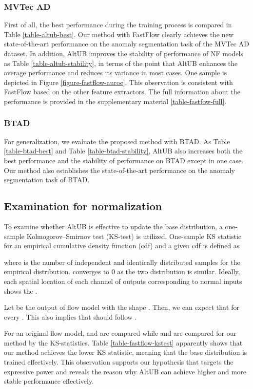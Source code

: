 \documentclass[letterpaper]{article}
\begin{document}
\subsubsection{MVTec AD}
First of all, the best performance during the training process is compared in Table \ref{table-altub-best}. Our method with FastFlow clearly achieves the new state-of-the-art performance on the anomaly segmentation task of the MVTec AD dataset. In addition, AltUB improves the stability of performance of NF models as Table \ref{table-altub-stability}, in terms of the point that AltUB enhances the average performance and reduces its variance in most cases. One sample is depicted in Figure \ref{figure-fastflow-auroc}.
This observation is consistent with FastFlow based on the other feature extractors. The full information about the performance is provided in the supplementary material \ref{table-fastfow-full}.
\subsubsection{BTAD}
For generalization, we evaluate the proposed method with BTAD. As Table \ref{table-btad-best} and Table \ref{table-btad-stability}, AltUB also increases both the best performance and the stability of performance on BTAD except in one case. Our method also establishes the state-of-the-art performance on the anomaly segmentation task of BTAD.

\subsection{Examination for normalization}
To examine whether AltUB is effective to update the base distribution, a one-sample Kolmogorov–Smirnov test (KS-test) is utilized. One-sample KS statistic for an empirical cumulative density function (cdf)  and a given cdf  is defined as 

where  is the number of independent and identically distributed samples for the empirical distribution.
 converges to 0 as the two distribution is similar. Ideally, each spatial location of each channel of outputs corresponding to normal inputs shows the .

Let  be the output of flow model with the shape . Then, we can expect that  for every . This also implies that  should follow .

For an original flow model,  and  are compared while  and  are compared for our method by the KS-statistics. Table \ref{table-fastflow-kstest} apparently shows that our method achieves the lower KS statistic, meaning that the base distribution is trained effectively. This observation supports our hypothesis that targets the expressive power and reveals the reason why AltUB can achieve higher and more stable performance effectively.
\end{document}
